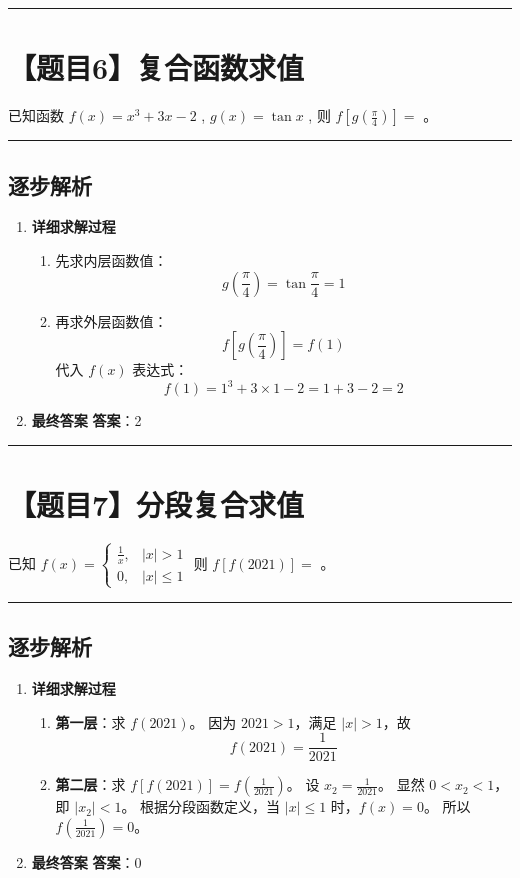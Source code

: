 \documentclass[UTF8]{ctexart}
\newenvironment{redenv}{\color{red}}{}
\newenvironment{detailedanalysis}{%
    \color{red}
    \begin{enumerate}[label=\textbf{第\arabic*步：}, leftmargin=*, align=left, itemsep=1.5ex]
}{%
    \end{enumerate}
}
\newcommand{\problemrule}{\noindent\rule{\textwidth}{1.5pt}\vspace{-0.8em}}
\newcommand{\analysisrule}{\noindent\rule{\textwidth}{0.8pt}\vspace{-0.8em}}
\newcommand{\blank}[1]{\underline{\hspace{#1}}}
\begin{document}
\problemrule
\section*{【题目6】复合函数求值}
已知函数 $ f(x)=x^{3}+3x-2 $ , $ g(x)=\tan x $ , 则 $ f[g(\frac{\pi}{4})]= $ \blank{2cm}。

\begin{redenv}
\analysisrule
\subsection*{逐步解析}

\begin{detailedanalysis}
\item \textbf{详细求解过程}
\begin{enumerate}[label=(\arabic*)]
\item 先求内层函数值：
$$ g(\frac{\pi}{4}) = \tan \frac{\pi}{4} = 1 $$
\item 再求外层函数值：
$$ f[g(\frac{\pi}{4})] = f(1) $$
代入 $f(x)$ 表达式：
$$ f(1) = 1^3 + 3 \times 1 - 2 = 1 + 3 - 2 = 2 $$
\end{enumerate}

\item \textbf{最终答案}
\textbf{答案}：2
\end{detailedanalysis}
\end{redenv}

\problemrule
\section*{【题目7】分段复合求值}
已知 $ f(x)=\begin{cases}\frac{1}{x}, & |x|>1\\0, & |x|\leq1\end{cases} $ 则 $ f[f(2021)]= $ \blank{2cm}。

\begin{redenv}
\analysisrule
\subsection*{逐步解析}

\begin{detailedanalysis}
\item \textbf{详细求解过程}
\begin{enumerate}[label=(\arabic*)]
\item \textbf{第一层}：求 $f(2021)$。
因为 $2021 > 1$，满足 $|x|>1$，故
$$ f(2021) = \frac{1}{2021} $$
\item \textbf{第二层}：求 $ f[f(2021)] = f(\frac{1}{2021}) $。
设 $x_2 = \frac{1}{2021}$。
显然 $0 < x_2 < 1$，即 $|x_2| < 1$。
根据分段函数定义，当 $|x| \le 1$ 时，$f(x) = 0$。
所以 $ f(\frac{1}{2021}) = 0 $。
\end{enumerate}

\item \textbf{最终答案}
\textbf{答案}：0
\end{detailedanalysis}
\end{redenv}
\end{document}
